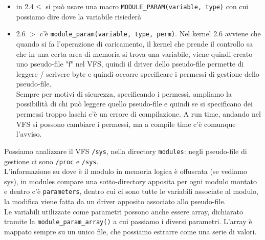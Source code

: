 \documentclass[12pt, oneside]{extbook}
\begin{document}
\begin{itemize}
\item in 2.4$\leq$ si può usare una macro \texttt{MODULE\_PARAM(variable, type)} con cui possiamo dire dove la variabile risiederà
\item 2.6 $>$ c'è \texttt{module\_param(variable, type, perm)}. Nel kernel 2.6 avviene che quando si fa l'operazione di caricamento, il kernel che prende il controllo sa che in una certa area di memoria si trova una variabile, viene quindi creato uno pseudo-file "f" nel VFS, quindi il driver dello pseudo-file permette di leggere / scrivere byte e quindi occorre specificare i permessi di gestione dello pseudo-file.\\Sempre per motivi di sicurezza, specificando i permessi, ampliamo la possibilità di chi può leggere quello pseudo-file e quindi se si specificano dei permessi troppo laschi c'è un errore di compilazione. A run time, andando nel VFS si possono cambiare i permessi, ma a compile time c'è comunque l'avviso.
\end{itemize}
Possiamo analizzare il VFS \texttt{/sys}, nella directory \texttt{modules}: negli pseudo-file di gestione ci sono \texttt{/proc} e \texttt{/sys}.\\L'informazione su dove è il modulo in memoria logica è offuscata (se vediamo sys), in modules compare una sotto-directory apposita per ogni modulo montato e dentro c'è \texttt{parameters}, dentro cui ci sono tutte le variabili associate al modulo, la modifica viene fatta da un driver apposito associato allo pseudo-file.\\Le variabili utilizzate come parametri possono anche essere array, dichiarato tramite la \texttt{module\_param\_array()} a cui passiamo i diversi parametri. L'array è mappato sempre su un unico file, che possiamo estrarre come una serie di valori.
\end{document}
